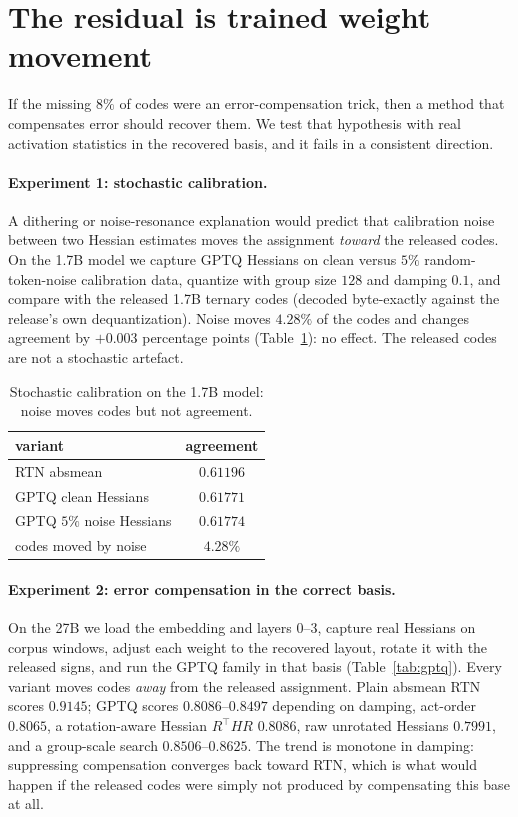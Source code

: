 \section{The residual is trained weight movement}
\label{sec:mechanism}

If the missing $8\%$ of codes were an error-compensation trick, then a method
that compensates error should recover them. We test that hypothesis with real
activation statistics in the recovered basis, and it fails in a consistent
direction.

\paragraph{Experiment 1: stochastic calibration.}
A dithering or noise-resonance explanation would predict that calibration
noise between two Hessian estimates moves the assignment \emph{toward} the
released codes. On the 1.7B model we capture GPTQ Hessians on clean versus
$5\%$ random-token-noise calibration data, quantize with group size $128$ and
damping $0.1$, and compare with the released 1.7B ternary codes (decoded
byte-exactly against the release's own dequantization). Noise moves $4.28\%$
of the codes and changes agreement by $+0.003$ percentage points
(Table~\ref{tab:scr}): no effect. The released codes are not a stochastic
artefact.

\begin{table}[t]
\caption{Stochastic calibration on the 1.7B model: noise moves codes but not
agreement.}
\label{tab:scr}
\begin{center}
\begin{tabular}{lc}
\toprule
variant & agreement \\
\midrule
RTN absmean & $0.61196$ \\
GPTQ clean Hessians & $0.61771$ \\
GPTQ $5\%$ noise Hessians & $0.61774$ \\
codes moved by noise & $4.28\%$ \\
\bottomrule
\end{tabular}
\end{center}
\end{table}

\paragraph{Experiment 2: error compensation in the correct basis.}
On the 27B we load the embedding and layers $0$--$3$, capture real
Hessians on corpus windows, adjust each weight to the recovered layout, rotate
it with the released signs, and run the GPTQ family in that basis
(Table~\ref{tab:gptq}). Every variant moves codes \emph{away} from the released
assignment. Plain absmean RTN scores $0.9145$; GPTQ scores $0.8086$--$0.8497$
depending on damping, act-order $0.8065$, a rotation-aware Hessian
$R^{\top} H R$ $0.8086$, raw unrotated Hessians $0.7991$, and a group-scale
search $0.8506$--$0.8625$. The trend is monotone in damping: suppressing
compensation converges back toward RTN, which is what would happen if the
released codes were simply not produced by compensating this base at all.

